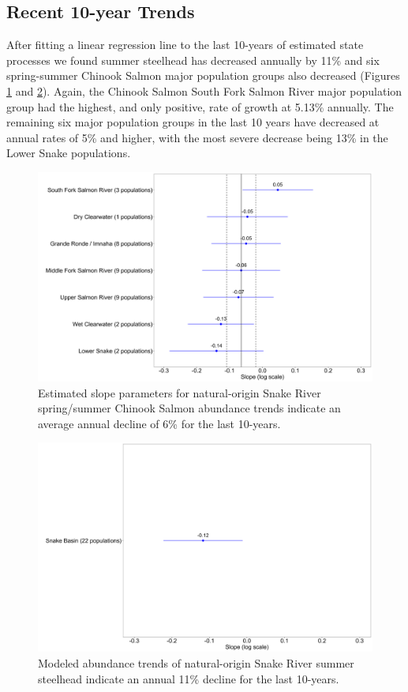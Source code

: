 \documentclass[12pt,a4paper]{article}
\begin{document}
\subsection{Recent 10-year Trends}\label{recent-10-year-trends-1}

After fitting a linear regression line to the last 10-years of estimated state processes we found summer steelhead has decreased annually by 11\% and six spring-summer Chinook Salmon major population groups also decreased (Figures \ref{fig:chn-sa-slope} and \ref{fig:sth-sa-slope}). Again, the Chinook Salmon South Fork Salmon River major population group had the highest, and only positive, rate of growth at 5.13\% annually. The remaining six major population groups in the last 10 years have decreased at annual rates of 5\% and higher, with the most severe decrease being 13\% in the Lower Snake populations.

\begin{figure}
\includegraphics[width=1\linewidth]{../figures/Chinook_salmon/Chinook_salmon_slope_2024} \caption{Estimated slope parameters for natural-origin Snake River spring/summer Chinook Salmon abundance trends indicate an average annual decline of 6\% for the last 10-years.}\label{fig:chn-sa-slope}
\end{figure}

\begin{figure}
\includegraphics[width=1\linewidth]{../figures/Steelhead/Steelhead_slope_2024} \caption{Modeled abundance trends of natural-origin Snake River summer steelhead indicate an annual 11\% decline for the last 10-years.}\label{fig:sth-sa-slope}
\end{figure}
\end{document}
